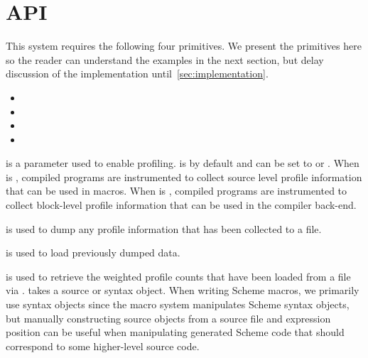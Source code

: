 \section{API}
\label{sec:api}

This system requires the following four primitives. We present the
primitives here so the reader can understand the examples in the next
section, but delay discussion of the implementation until~\ref{sec:implementation}.
\begin{itemize}
  \item {}
  \item {}
  \item {}
  \item {}
\end{itemize}

 is a parameter used to enable profiling.
 is  by default and can be set to
 or . When  is
, compiled programs are instrumented to collect source
level profile information that can be used in macros. When
 is , compiled programs are
instrumented to collect block-level profile information that can be used
in the compiler back-end.

 is used to dump any profile information that
has been collected to a file.

 is used to load previously dumped data. 

 is used to retrieve the weighted profile
counts that have been loaded from a file via .
 takes a source or syntax object. When
writing Scheme macros, we primarily use syntax objects since the macro
system manipulates Scheme syntax objects, but manually constructing
source objects from a source file and expression position can be useful
when manipulating generated Scheme code that should correspond to some
higher-level source code. 
